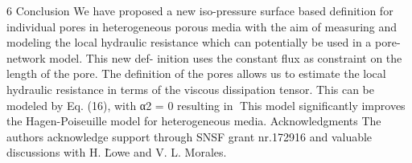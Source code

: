 6 Conclusion
We have proposed a new iso-pressure surface based definition for individual pores in heterogeneous porous media with the aim of measuring and modeling the local hydraulic resistance which can potentially be used in a pore-network model. This new def- inition uses the constant flux as constraint on the length of the pore. The definition of the pores allows us to estimate the local hydraulic resistance in terms of the viscous dissipation tensor. This can be modeled by Eq. (16), with α2 = 0 resulting in
􏰉This model significantly improves the Hagen-Poiseuille model for heterogeneous media.
Acknowledgments
The authors acknowledge support through SNSF grant nr.172916 and valuable discussions with H. L̈owe and V. L. Morales.